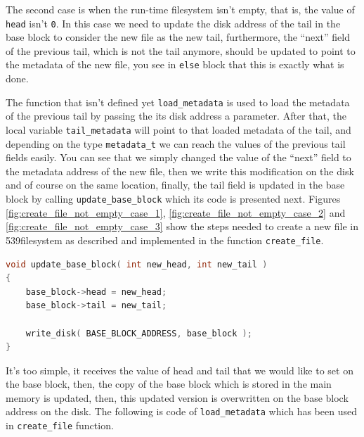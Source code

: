 The second case is when the run-time filesystem isn't empty, that is,
the value of \lstinline!head! isn't \lstinline!0!. In this case we need
to update the disk address of the tail in the base block to consider the
new file as the new tail, furthermore, the ``next'' field of the
previous tail, which is not the tail anymore, should be updated to point
to the metadata of the new file, you see in \lstinline!else! block that
this is exactly what is done.

The function that isn't defined yet \lstinline!load_metadata! is used to
load the metadata of the previous tail by passing the its disk address a
parameter. After that, the local variable \lstinline!tail_metadata! will
point to that loaded metadata of the tail, and depending on the type
\lstinline!metadata_t! we can reach the values of the previous tail
fields easily. You can see that we simply changed the value of the
``next'' field to the metadata address of the new file, then we write
this modification on the disk and of course on the same location,
finally, the tail field is updated in the base block by calling
\lstinline!update_base_block! which its code is presented next. Figures
\ref{fig:create_file_not_empty_case_1},
\ref{fig:create_file_not_empty_case_2} and
\ref{fig:create_file_not_empty_case_3} show the steps needed to create a
new file in 539filesystem as described and implemented in the function
\lstinline!create_file!.

\begin{lstlisting}[language=C]
void update_base_block( int new_head, int new_tail )
{
    base_block->head = new_head;
    base_block->tail = new_tail;
    
    write_disk( BASE_BLOCK_ADDRESS, base_block );
}
\end{lstlisting}

It's too simple, it receives the value of head and tail that we would
like to set on the base block, then, the copy of the base block which is
stored in the main memory is updated, then, this updated version is
overwritten on the base block address on the disk. The following is code
of \lstinline!load_metadata! which has been used in
\lstinline!create_file! function.

